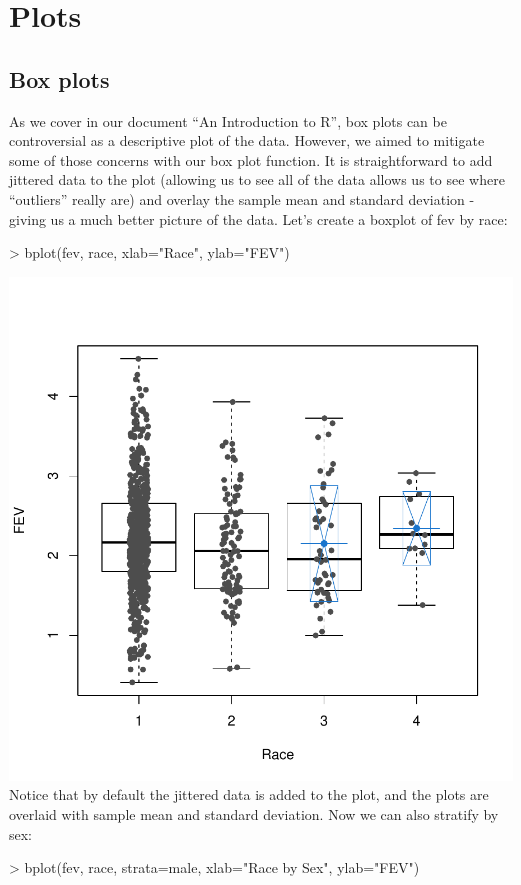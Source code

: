 \documentclass{article}
\begin{document}
\section{Plots}
\subsection{Box plots}
As we cover in our document ``An Introduction to R'', box plots can be controversial as a descriptive plot of the data. However, we aimed to mitigate some of those concerns with our box plot function. It is straightforward to add jittered data to the plot (allowing us to see all of the data allows us to see where ``outliers'' really are) and overlay the sample mean and standard deviation - giving us a much better picture of the data. Let's create a boxplot of fev by race:
\begin{Schunk}
\begin{Sinput}
> bplot(fev, race, xlab="Race", ylab="FEV")
\end{Sinput}
\end{Schunk}
\includegraphics{exampledoc-009}
\\Notice that by default the jittered data is added to the plot, and the plots are overlaid with sample mean and standard deviation. Now we can also stratify by sex:
\begin{Schunk}
\begin{Sinput}
> bplot(fev, race, strata=male, xlab="Race by Sex", ylab="FEV")
\end{Sinput}
\end{Schunk}
\end{document}
